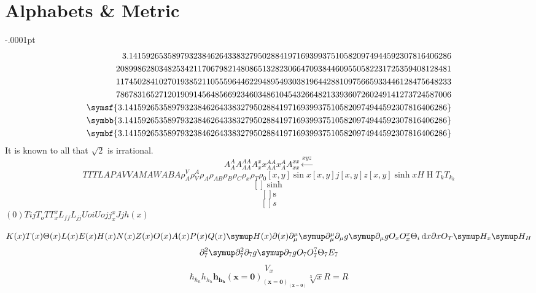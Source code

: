 \documentclass[11pt,fleqn]{article}
\newcommand{\dd}{\,\mathrm{d}}
\begin{document}
\section{Alphabets \& Metric}
\delimitershortfall-.0001pt
\[\begin{split}
  3.141592653589793238462643383279502884197169399375105820974944592307816406286\\
  208998628034825342117067982148086513282306647093844609550582231725359408128481\\ 117450284102701938521105559644622948954930381964428810975665933446128475648233\\ 786783165271201909145648566923460348610454326648213393607260249141273724587006\\
  \symsf{3.141592653589793238462643383279502884197169399375105820974944592307816406286}\\
  \symbb{3.141592653589793238462643383279502884197169399375105820974944592307816406286}\\
  \symbf{3.141592653589793238462643383279502884197169399375105820974944592307816406286}\\
\end{split}\]
It is known to all that $\sqrt 2$ is irrational.
\[A_A^AA_{AA}^{AA}A_x^x x_{AA}^{AA} x_A^A A_{xx}^{xx}\xleftarrow{xyz}\]
\[TT{}TLAPAVVAMAWABA\rho_A^V\rho_V^A\rho_{A{}}\rho_{AB}\rho_B\rho_C\rho_x\rho_{T{}}\rho_0[x,y]\sin x[x,y]j[x,y]z[x,y]\sinh xH\upEta T_kT_{k_k}\]
\[[]\sinh\]
\[[]\mathrm s\]
\[[]s\]
$(0) T{ijT_oTT_x^xL_{ff}L_{jj}Uo}iUojj_x^xJjh(x)$

$K(x)T(x)\Theta(x)L(x)E(x)H(x)N(x)Z(x)O(x)A(x)P(x)Q(x)\symup H(x)\partial(x)\partial_\mu^\mu\symup\partial_\mu^\mu\partial_\mu g\symup\partial_\mu g O_xO_x^x\Theta_{i}\dd  x \partial x O_T\symup H_x\symup H_H$
\[\partial_7^2\symup\partial_7^2\partial_7 g\symup\partial_7 g O_7O_7^7\Theta_{7}E_7\]
\[V_{x}\]
\[\hbar_{\hbar_\hbar} h_{h_h}\symbf{h_{h_h}(x=0)_{(x=0)_{(x=0)}}}\sqrt[3]{x}R=R\]
\end{document}

